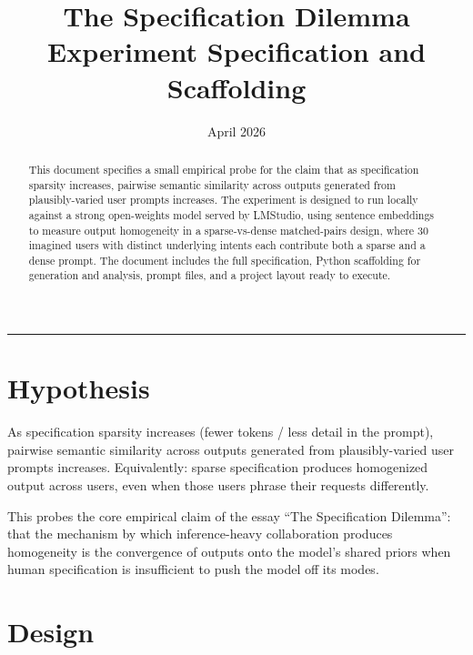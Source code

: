 \documentclass[11pt]{article}
\title{\textbf{The Specification Dilemma}\\[4pt]
  \large Experiment Specification and Scaffolding}
\author{}
\date{April 2026}
\begin{document}
\maketitle
\thispagestyle{empty}

\begin{abstract}
\noindent This document specifies a small empirical probe for the claim that as specification sparsity increases, pairwise semantic similarity across outputs generated from plausibly-varied user prompts increases. The experiment is designed to run locally against a strong open-weights model served by LMStudio, using sentence embeddings to measure output homogeneity in a sparse-vs-dense matched-pairs design, where 30 imagined users with distinct underlying intents each contribute both a sparse and a dense prompt. The document includes the full specification, Python scaffolding for generation and analysis, prompt files, and a project layout ready to execute.
\end{abstract}

\vspace{1em}
\hrule
\vspace{1em}

\tableofcontents

\newpage

\section{Hypothesis}

As specification sparsity increases (fewer tokens / less detail in the prompt), pairwise semantic similarity across outputs generated from plausibly-varied user prompts increases. Equivalently: sparse specification produces homogenized output across users, even when those users phrase their requests differently.

This probes the core empirical claim of the essay ``The Specification Dilemma'': that the mechanism by which inference-heavy collaboration produces homogeneity is the convergence of outputs onto the model's shared priors when human specification is insufficient to push the model off its modes.

\section{Design}
\end{document}
